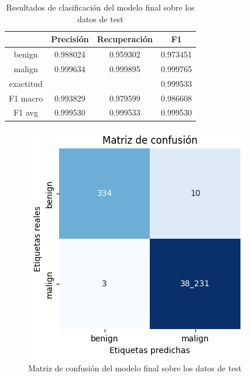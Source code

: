 \documentclass[10pt,a4paper,twoside]{article}
\begin{document}
\begin{multicols}{2}
    \begin{table}[H]
        \begin{center}
            \begin{tabular}{|c | c c c |} 
                \hline
                & \textbf{Precisión} & \textbf{Recuperación} & \textbf{F1}\\
                \hline
                benign               & 0.988024 & 0.959302 & 0.973451 \\
                malign               & 0.999634 & 0.999895 & 0.999765  \\
                \hline
                exactitud            &          &          & 0.999533 \\
                F1 macro             & 0.993829 & 0.979599 & 0.986608 \\
                F1 avg               & 0.999530 & 0.999533 & 0.999530 \\
                \hline
            \end{tabular}
        \end{center}
        \caption{Resultados de clasificación del modelo final sobre los datos de test}
        \label{table:selectedresults}
    \end{table}
    
    \begin{figure}[H]
        \begin{center}
            \includegraphics[width=\linewidth]{../report/media/packet_pincer_train_model_random_forest_selected.png}
        \end{center}
        \caption{Matriz de confusión del modelo final sobre los datos de test}\label{fig:selectedmatrix}
    \end{figure}
    

\end{multicols}
\end{document}
